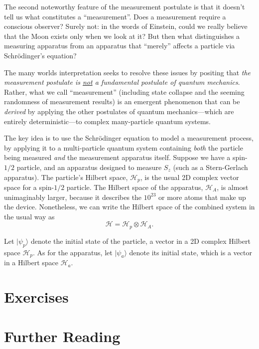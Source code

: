 \documentclass[pra,11pt]{revtex4}
\begin{document}
The second noteworthy feature of the measurement postulate is that it
doesn't tell us what constitutes a ``measurement''.  Does a
measurement require a conscious observer?  Surely not: in the words of
Einstein, could we really believe that the Moon exists only when we
look at it?  But then what distinguishes a measuring apparatus from an
apparatus that ``merely'' affects a particle via Schr\"odinger's
equation?

The many worlds interpretation seeks to resolve these issues by
positing that \textit{the measurement postulate is \underline{not} a
  fundamental postulate of quantum mechanics}.  Rather, what we call
``measurement'' (including state collapse and the seeming randomness
of measurement results) is an emergent phenomenon that can be
\textit{derived} by applying the other postulates of quantum
mechanics---which are entirely deterministic---to complex
many-particle quantum systems.

The key idea is to use the Schr\"odinger equation to model a
measurement process, by applying it to a multi-particle quantum system
containing \textit{both} the particle being measured \textit{and} the
measurement apparatus itself.  Suppose we have a spin-$1/2$ particle,
and an apparatus designed to measure $S_z$ (such as a Stern-Gerlach
apparatus).  The particle's Hilbert space, $\mathscr{H}_p$, is the
usual 2D complex vector space for a spin-$1/2$ particle.  The Hilbert
space of the apparatus, $\mathscr{H}_A$, is almost unimaginably
larger, because it describes the $10^{23}$ or more atoms that make up
the device.  Nonetheless, we can write the Hilbert space of the
combined system in the usual way as
$$\mathscr{H} = \mathscr{H}_p \otimes \mathscr{H}_A.$$


Let
$|\psi_p\rangle$ denote the initial state of the particle, a vector in
a 2D complex Hilbert space $\mathscr{H}_p$.  As for the apparatus, let
$|\psi_a\rangle$ denote its initial state, which is a vector in a
Hilbert space $\mathscr{H}_a$.





\section{Exercises}





\section{Further Reading}
\end{document}
